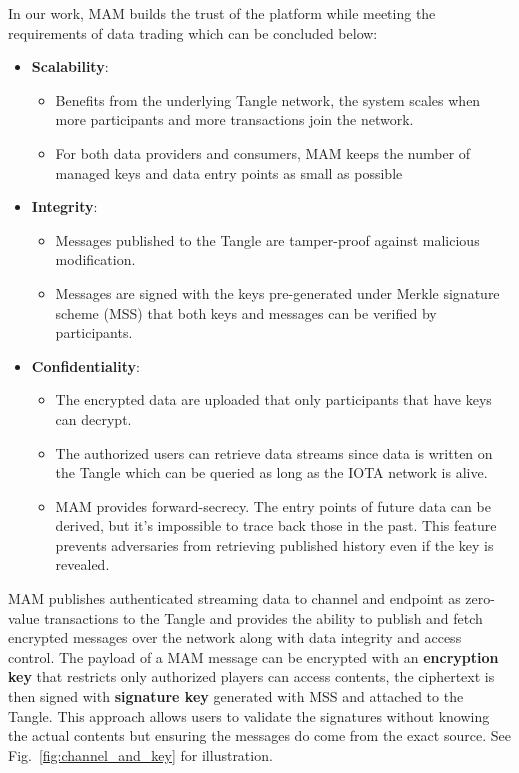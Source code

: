 \begin{spacing}{2.0}
In our work, MAM builds the trust of the platform while meeting the requirements of data trading which can be concluded below:

\begin{itemize}
    \item \textbf{Scalability}:
    \begin{itemize}
        \item Benefits from the underlying Tangle network, the system scales when more participants and more transactions join the network.
        \item For both data providers and consumers, MAM keeps the number of managed keys and data entry points as small as possible
    \end{itemize}    
    \item \textbf{Integrity}:
    \begin{itemize}
        \item Messages published to the Tangle are tamper-proof against malicious modification.
        \item Messages are signed with the keys pre-generated under Merkle signature scheme\cite{MSS} (MSS) that both keys and messages can be verified by participants.
    \end{itemize}
    \item \textbf{Confidentiality}:
    \begin{itemize}
        \item The encrypted data are uploaded that only participants that have keys can decrypt.
        \item The authorized users can retrieve data streams since data is written on the Tangle which can be queried as long as the IOTA network is alive.
        \item MAM provides forward-secrecy. The entry points of future data can be derived, but it's impossible to trace back those in the past. This feature prevents adversaries from retrieving published history even if the key is revealed.
    \end{itemize}
\end{itemize}

MAM publishes authenticated streaming data to channel and endpoint as zero-value transactions to the Tangle and provides the ability to publish and fetch encrypted messages over the network along with data integrity and access control. The payload of a MAM message can be encrypted with an \textbf{encryption key} that restricts only authorized players can access contents, the ciphertext is then signed with \textbf{signature key} generated with MSS and attached to the Tangle. This approach allows users to validate the signatures without knowing the actual contents but ensuring the messages do come from the exact source. See Fig.~\ref{fig:channel_and_key} for illustration.


\end{spacing}
